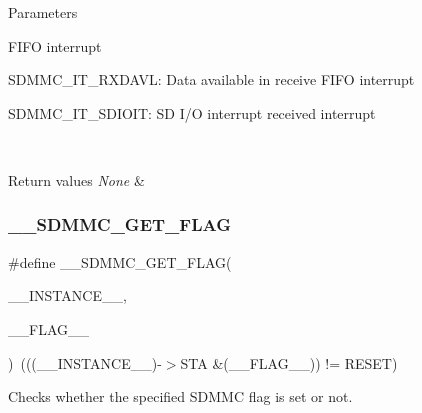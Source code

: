 \begin{DoxyParams}{Parameters}
\begin{DoxyItemize}
F\+I\+FO interrupt \item S\+D\+M\+M\+C\+\_\+\+I\+T\+\_\+\+R\+X\+D\+A\+VL\+: Data available in receive F\+I\+FO interrupt \item S\+D\+M\+M\+C\+\_\+\+I\+T\+\_\+\+S\+D\+I\+O\+IT\+: SD I/O interrupt received interrupt\end{DoxyItemize}
\\
\hline
\end{DoxyParams}

\begin{DoxyRetVals}{Return values}
{\em None} & \\
\hline
\end{DoxyRetVals}
\mbox{\label{group___s_d_m_m_c___l_l___interrupt___clock_gaec3b40ed50180866f4b6329457157166}} 
\subsubsection{\texorpdfstring{\_\_SDMMC\_GET\_FLAG}{\_\_SDMMC\_GET\_FLAG}}
{\footnotesize\ttfamily \#define \+\_\+\+\_\+\+S\+D\+M\+M\+C\+\_\+\+G\+E\+T\+\_\+\+F\+L\+AG(\begin{DoxyParamCaption}\item[{}]{\+\_\+\+\_\+\+I\+N\+S\+T\+A\+N\+C\+E\+\_\+\+\_\+,  }\item[{}]{\+\_\+\+\_\+\+F\+L\+A\+G\+\_\+\+\_\+ }\end{DoxyParamCaption})~(((\+\_\+\+\_\+\+I\+N\+S\+T\+A\+N\+C\+E\+\_\+\+\_\+)-\/$>$S\+TA \&(\+\_\+\+\_\+\+F\+L\+A\+G\+\_\+\+\_\+)) != R\+E\+S\+ET)}



Checks whether the specified S\+D\+M\+MC flag is set or not. 


